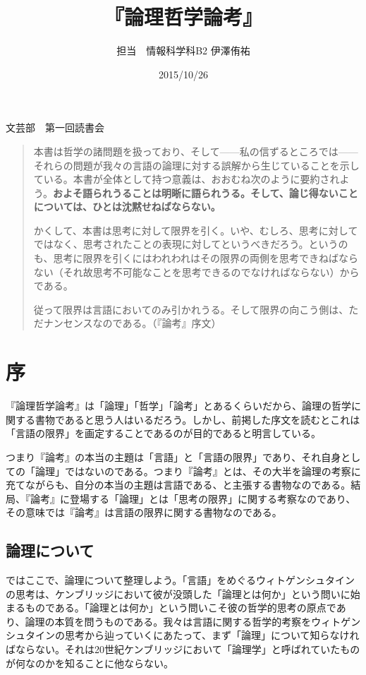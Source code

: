 \documentclass[a4paper,11pt]{jsarticle}
\title{『論理哲学論考』}
\author{担当　情報科学科B2 伊澤侑祐}
\date{2015/10/26}
\begin{document}
\maketitle

\begin{center}
文芸部　第一回読書会
\end{center}


\begin{quote}
本書は哲学の諸問題を扱っており、そして------私の信ずるところでは------それらの問題が我々の言語の論理に対する誤解から生じていることを示している。本書が全体として持つ意義は、おおむね次のように要約されよう。{\bf{およそ語られうることは明晰に語られうる。そして、論じ得ないことについては、ひとは沈黙せねばならない。}}

かくして、本書は思考に対して限界を引く。いや、むしろ、思考に対してではなく、思考されたことの表現に対してというべきだろう。というのも、思考に限界を引くにはわれわれはその限界の両側を思考できねばならない（それ故思考不可能なことを思考できるのでなければならない）からである。

従って限界は言語においてのみ引かれうる。そして限界の向こう側は、ただナンセンスなのである。（『論考』序文）
\end{quote}
\section{序}
『論理哲学論考』は「論理」「哲学」「論考」とあるくらいだから、論理の哲学に関する書物であると思う人はいるだろう。しかし、前掲した序文を読むとこれは「言語の限界」を画定することであるのが目的であると明言している。

つまり『論考』の本当の主題は「言語」と「言語の限界」であり、それ自身としての「論理」ではないのである。つまり『論考』とは、その大半を論理の考察に充てながらも、自分の本当の主題は言語である、と主張する書物なのである。結局、『論考』に登場する「論理」とは「思考の限界」に関する考察なのであり、その意味では『論考』は言語の限界に関する書物なのである。

\subsection{論理について}
ではここで、論理について整理しよう。「言語」をめぐるウィトゲンシュタインの思考は、ケンブリッジにおいて彼が没頭した「論理とは何か」という問いに始まるものである。「論理とは何か」という問いこそ彼の哲学的思考の原点であり、論理の本質を問うものである。我々は言語に関する哲学的考察をウィトゲンシュタインの思考から辿っていくにあたって、まず「論理」について知らなければならない。それは20世紀ケンブリッジにおいて「論理学」と呼ばれていたものが何なのかを知ることに他ならない。
\end{document}
